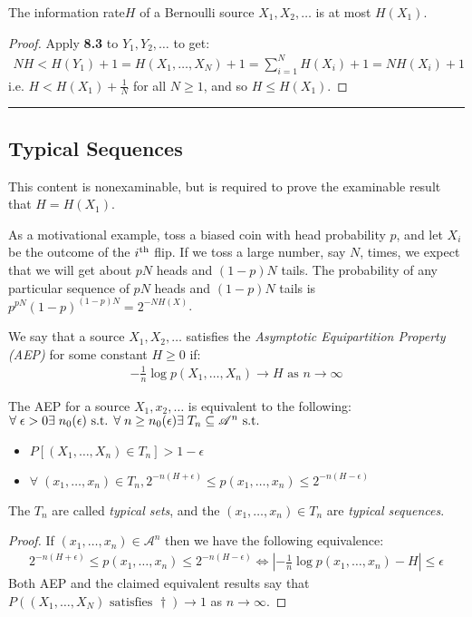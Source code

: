 \documentclass[10pt,a4paper]{article}
\begin{document}
\begin{proposition}
The information rate$H$ of a Bernoulli source $X_1, X_2, \ldots$ is at most $H(X_1)$.
\end{proposition}
\begin{proof}
Apply \textbf{8.3} to $Y_1, Y_2, \ldots$ to get:
\begin{align*}
NH < H(Y_1) + 1 = H(X_1, \ldots, X_N) + 1 = \sum_{i=1}^N H(X_i) + 1 = NH(X_i)+1
\end{align*}
i.e. $H < H(X_1) + \frac1N$ for all $N \geq 1$, and so $H \leq H(X_1)$.
\end{proof}

\hrule
\subsection{Typical Sequences}
This content is nonexaminable, but is required to prove the examinable result that $H = H(X_1)$.

\hspace*{-1em}As a motivational example, toss a biased coin with head probability $p$, and let $X_i$ be the outcome of the $i\textsuperscript{th}$ flip. If we toss a large number, say $N$, times, we expect that we will get about $pN$ heads and $(1-p)N$ tails. The probability of any particular sequence of $pN$ heads and $(1-p)N$ tails is $p^{pN}(1-p)^{(1-p)N} = 2^{-NH(X)}$.

We say that a source $X_1, X_2, \ldots$ satisfies the \emph{Asymptotic Equipartition Property (AEP)} for some constant $H \geq 0$ if:
\begin{align*}
-\frac1n\log p(X_1, \ldots, X_n) \to H \text{ as } n \to \infty
\end{align*}
\begin{lemma}
The AEP for a source $X_1, x_2, \ldots$ is equivalent to the following:\\
$\forall\;\epsilon>0 \exists n_0(\epsilon) \st \forall\;n\geq n_0(\epsilon) \exists T_n \subseteq \mathscr{A}^n \st$
\begin{itemize}
\item $P[(X_1, \ldots, X_n) \in T_n] > 1-\epsilon$
\item $\forall\;(x_1, \ldots, x_n) \in T_n, 2^{-n(H+\epsilon)} \leq p(x_1, \ldots, x_n) \leq 2^{-n(H-\epsilon)}$
\end{itemize}
The $T_n$ are called \emph{typical sets}, and the $(x_1, \ldots, x_n) \in T_n$ are \emph{typical sequences}.
\end{lemma}
\begin{proof}
If $(x_1, \ldots, x_n) \in \mathscr{A}^n$ then we have the following equivalence:
\begin{align*}
2^{-n(H+\epsilon)} \leq p(x_1, \ldots, x_n) \leq 2^{-n(H-\epsilon)} \iff |-\frac1n \log p(x_1, \ldots, x_n) - H| \leq \epsilon \tag{\dagger}
\end{align*}
Both AEP and the claimed equivalent results say that $P((X_1, \ldots, X_N)\text{ satisfies } \dagger) \to 1$ as $n \to \infty$.
\end{proof}
\end{document}
